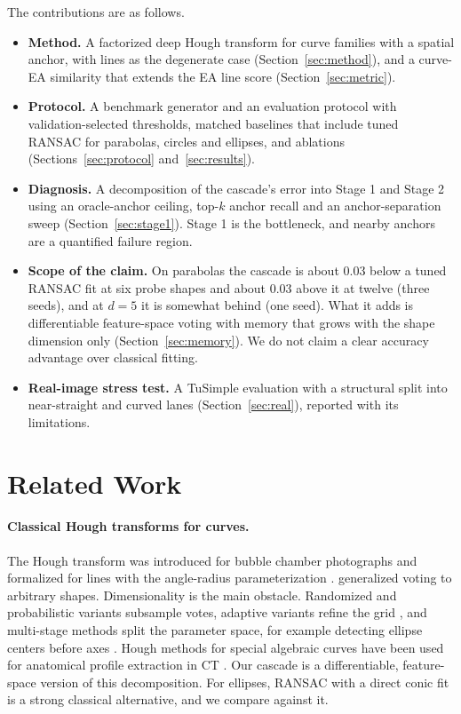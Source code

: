 \documentclass[11pt]{article}
\begin{document}
The contributions are as follows.
\begin{itemize}
  \item \textbf{Method.} A factorized deep Hough transform for curve families with a spatial anchor, with lines as the degenerate case (Section~\ref{sec:method}), and a curve-EA similarity that extends the EA line score (Section~\ref{sec:metric}).
  \item \textbf{Protocol.} A benchmark generator and an evaluation protocol with validation-selected thresholds, matched baselines that include tuned RANSAC for parabolas, circles and ellipses, and ablations (Sections~\ref{sec:protocol} and~\ref{sec:results}).
  \item \textbf{Diagnosis.} A decomposition of the cascade's error into Stage 1 and Stage 2 using an oracle-anchor ceiling, top-$k$ anchor recall and an anchor-separation sweep (Section~\ref{sec:stage1}). Stage 1 is the bottleneck, and nearby anchors are a quantified failure region.
  \item \textbf{Scope of the claim.} On parabolas the cascade is about 0.03 below a tuned RANSAC fit at six probe shapes and about 0.03 above it at twelve (three seeds), and at $d=5$ it is somewhat behind (one seed). What it adds is differentiable feature-space voting with memory that grows with the shape dimension only (Section~\ref{sec:memory}). We do not claim a clear accuracy advantage over classical fitting.
  \item \textbf{Real-image stress test.} A TuSimple evaluation with a structural split into near-straight and curved lanes (Section~\ref{sec:real}), reported with its limitations.
\end{itemize}

\section{Related Work}
\paragraph{Classical Hough transforms for curves.}
The Hough transform was introduced for bubble chamber photographs \citep{hough1962} and formalized for lines with the angle-radius parameterization \citep{duda1972}. \citet{ballard1981} generalized voting to arbitrary shapes. Dimensionality is the main obstacle. Randomized \citep{xu1990rht} and probabilistic \citep{kiryati1991} variants subsample votes, adaptive variants refine the grid \citep{illingworth1987}, and multi-stage methods split the parameter space, for example detecting ellipse centers before axes \citep{yuen1989ellipse}. Hough methods for special algebraic curves have been used for anatomical profile extraction in CT \citep{torrente2014,massone2015}. Our cascade is a differentiable, feature-space version of this decomposition. For ellipses, RANSAC with a direct conic fit \citep{fischler1981ransac,fitzgibbon1999ellipse} is a strong classical alternative, and we compare against it.
\end{document}
